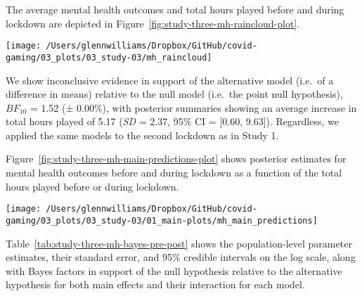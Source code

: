\documentclass[
  english,
  man,floatsintext]{apa6}
\begin{document}
The average mental health outcomes and total hours played before and during lockdown are depicted in Figure~\ref{fig:study-three-mh-raincloud-plot}.

\begin{figure*}[!htbp]

{\centering \texttt{[image: /Users/glennwilliams/Dropbox/GitHub/covid-gaming/03\_plots/03\_study-03/mh\_raincloud]} 

}

\caption{Mental health outcomes for the depression, anxiety, stress, and loneliness along with total hours played before and during lockdown. Dots represent individual participants' mean (jittered) scores.}\label{fig:study-three-mh-raincloud-plot}
\end{figure*}

We show inconclusive evidence in support of the alternative model (i.e.~of a difference in means) relative to the null model (i.e.~the point null hypothesis), \(BF_{10}\) = 1.52 (± 0.00\%), with posterior summaries showing an average increase in total hours played of 5.17 (\emph{SD} = 2.37, 95\% CI = {[}0.60, 9.63{]}). Regardless, we applied the same models to the second lockdown as in Study 1.

Figure~\ref{fig:study-three-mh-main-predictions-plot} shows posterior estimates for mental health outcomes before and during lockdown as a function of the total hours played before or during lockdown.

\begin{figure*}[!htbp]

{\centering \texttt{[image: /Users/glennwilliams/Dropbox/GitHub/covid-gaming/03\_plots/03\_study-03/01\_main-plots/mh\_main\_predictions]} 

}

\caption{Mental health outcomes for the depression, anxiety, stress, and loneliness measures as a function of total hours played before and during lockdown. Lines and ribbons indicate the posterior median ± 95\% credible intervals.}\label{fig:study-three-mh-main-predictions-plot}
\end{figure*}

Table~\ref{tab:study-three-mh-bayes-pre-post} shows the population-level parameter estimates, their standard error, and 95\% credible intervals on the log scale, along with Bayes factors in support of the null hypothesis relative to the alternative hypothesis for both main effects and their interaction for each model.
\end{document}
